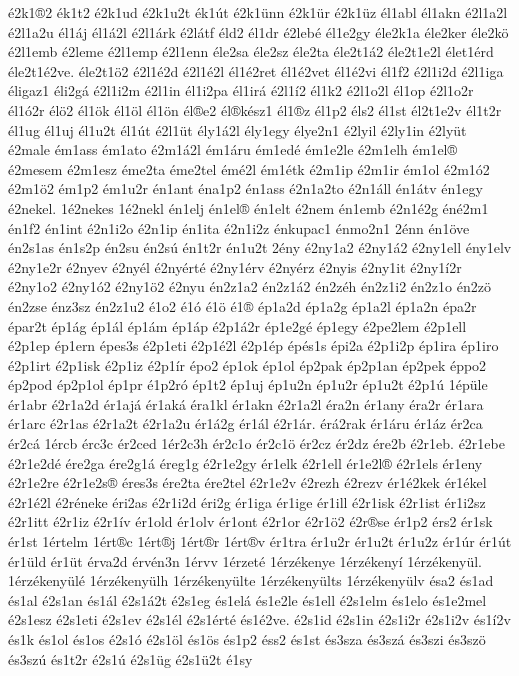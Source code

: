 {é2k1®2
ék1t2
é2k1ud
é2k1u2t
ék1út
é2k1ünn
é2k1ür
é2k1üz
él1abl
él1akn
é2l1a2l
é2l1a2u
él1áj
él1á2l
é2l1árk
é2látf
éld2
él1dr
é2lebé
él1e2gy
éle2k1a
éle2ker
éle2kö
é2l1emb
é2leme
é2l1emp
é2l1enn
éle2sa
éle2sz
éle2ta
éle2t1á2
éle2t1e2l
élet1érd
éle2t1é2ve.
éle2t1ö2
é2l1é2d
é2l1é2l
él1é2ret
él1é2vet
él1é2vi
él1f2
é2l1i2d
é2l1iga
éligaz1
éli2gá
é2l1i2m
é2l1in
él1i2pa
él1irá
é2l1í2
él1k2
é2l1o2l
él1op
é2l1o2r
él1ó2r
élö2
él1ök
él1öl
él1ön
él®e2
él®kész1
él1®z
él1p2
éls2
él1st
él2t1e2v
él1t2r
él1ug
él1uj
él1u2t
él1út
é2l1üt
ély1á2l
ély1egy
élye2n1
é2lyil
é2ly1in
é2lyüt
é2male
ém1ass
ém1ato
é2m1á2l
ém1áru
ém1edé
ém1e2le
é2m1elh
ém1el®
é2mesem
é2m1esz
éme2ta
éme2tel
émé2l
ém1étk
é2m1ip
é2m1ir
ém1ol
é2m1ó2
é2m1ö2
ém1p2
ém1u2r
én1ant
éna1p2
én1ass
é2n1a2to
é2n1áll
én1átv
én1egy
é2nekel.
1é2nekes
1é2nekl
én1elj
én1el®
én1elt
é2nem
én1emb
é2n1é2g
éné2m1
én1f2
én1int
é2n1i2o
é2n1ip
én1ita
é2n1i2z
énkupac1
énmo2n1
2énn
én1öve
én2s1as
én1s2p
én2su
én2sú
én1t2r
én1u2t
2ény
é2ny1a2
é2ny1á2
é2ny1ell
ény1elv
é2ny1e2r
é2nyev
é2nyél
é2nyérté
é2ny1érv
é2nyérz
é2nyis
é2ny1it
é2ny1í2r
é2ny1o2
é2ny1ó2
é2ny1ö2
é2nyu
én2z1a2
én2z1á2
én2zéh
én2z1i2
én2z1o
én2zö
én2zse
énz3sz
én2z1u2
é1o2
é1ó
é1ö
é1®
ép1a2d
ép1a2g
ép1a2l
ép1a2n
épa2r
épar2t
ép1ág
ép1ál
ép1ám
ép1áp
é2p1á2r
ép1e2gé
ép1egy
é2pe2lem
é2p1ell
é2p1ep
ép1ern
épes3s
é2p1eti
é2p1é2l
é2p1ép
épés1s
épi2a
é2p1i2p
ép1ira
ép1iro
é2p1irt
é2p1isk
é2p1iz
é2p1ír
épo2
ép1ok
ép1ol
ép2pak
ép2p1an
ép2pek
éppo2
ép2pod
ép2p1ol
ép1pr
é1p2ró
ép1t2
ép1uj
ép1u2n
ép1u2r
ép1u2t
é2p1ú
1épüle
ér1abr
é2r1a2d
ér1ajá
ér1aká
éra1kl
ér1akn
é2r1a2l
éra2n
ér1any
éra2r
ér1ara
ér1arc
é2r1as
é2r1a2t
é2r1a2u
ér1á2g
ér1ál
é2r1ár.
érá2rak
ér1áru
ér1áz
ér2ca
ér2cá
1ércb
érc3c
ér2ced
1ér2c3h
ér2c1o
ér2c1ö
ér2cz
ér2dz
ére2b
é2r1eb.
é2r1ebe
é2r1e2dé
ére2ga
ére2g1á
éreg1g
é2r1e2gy
ér1elk
é2r1ell
ér1e2l®
é2r1els
ér1eny
é2r1e2re
é2r1e2s®
éres3s
ére2ta
ére2tel
é2r1e2v
é2rezh
é2rezv
ér1é2kek
ér1ékel
é2r1é2l
é2réneke
éri2as
é2r1i2d
éri2g
ér1iga
ér1ige
ér1ill
é2r1isk
é2r1ist
ér1i2sz
é2r1itt
é2r1iz
é2r1ív
ér1old
ér1olv
ér1ont
é2r1or
é2r1ö2
é2r®se
ér1p2
érs2
ér1sk
ér1st
1értelm
1ért®c
1ért®j
1ért®r
1ért®v
ér1tra
ér1u2r
ér1u2t
ér1u2z
ér1úr
ér1út
ér1üld
ér1üt
érva2d
érvén3n
1érvv
1érzeté
1érzékenye
1érzékenyí
1érzékenyül.
1érzékenyülé
1érzékenyülh
1érzékenyülte
1érzékenyülts
1érzékenyülv
ésa2
és1ad
és1al
é2s1an
és1ál
é2s1á2t
é2s1eg
és1elá
és1e2le
és1ell
é2s1elm
és1elo
és1e2mel
é2s1esz
é2s1eti
é2s1ev
é2s1él
é2s1érté
és1é2ve.
é2s1id
é2s1in
é2s1i2r
é2s1i2v
és1í2v
és1k
és1ol
és1os
é2s1ó
é2s1öl
és1ös
és1p2
éss2
és1st
és3sza
és3szá
és3szi
és3szö
és3szú
és1t2r
é2s1ú
é2s1üg
é2s1ü2t
é1sy
}
